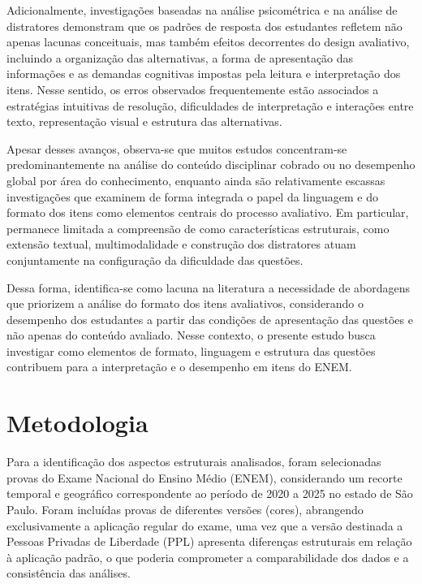 \documentclass[a4paper,10pt, twocolumn]{article}
\begin{document}
Adicionalmente, investigações baseadas na análise psicométrica e na análise de distratores demonstram que os padrões de resposta dos estudantes refletem não apenas lacunas conceituais, mas também efeitos decorrentes do design avaliativo, incluindo a organização das alternativas, a forma de apresentação das informações e as demandas cognitivas impostas pela leitura e interpretação dos itens. Nesse sentido, os erros observados frequentemente estão associados a estratégias intuitivas de resolução, dificuldades de interpretação e interações entre texto, representação visual e estrutura das alternativas.

Apesar desses avanços, observa-se que muitos estudos concentram-se predominantemente na análise do conteúdo disciplinar cobrado ou no desempenho global por área do conhecimento, enquanto ainda são relativamente escassas investigações que examinem de forma integrada o papel da linguagem e do formato dos itens como elementos centrais do processo avaliativo. Em particular, permanece limitada a compreensão de como características estruturais, como extensão textual, multimodalidade e construção dos distratores atuam conjuntamente na configuração da dificuldade das questões.

Dessa forma, identifica-se como lacuna na literatura a necessidade de abordagens que priorizem a análise do formato dos itens avaliativos, considerando o desempenho dos estudantes a partir das condições de apresentação das questões e não apenas do conteúdo avaliado. Nesse contexto, o presente estudo busca investigar como elementos de formato, linguagem e estrutura das questões contribuem para a interpretação e o desempenho em itens do ENEM.


\section{Metodologia}

Para a identificação dos aspectos estruturais analisados, foram selecionadas provas do Exame Nacional do Ensino Médio (ENEM), considerando um recorte temporal e geográfico correspondente ao período de 2020 a 2025 no estado de São Paulo. Foram incluídas provas de diferentes versões (cores), abrangendo exclusivamente a aplicação regular do exame, uma vez que a versão destinada a Pessoas Privadas de Liberdade (PPL) apresenta diferenças estruturais em relação à aplicação padrão, o que poderia comprometer a comparabilidade dos dados e a consistência das análises.
\end{document}
